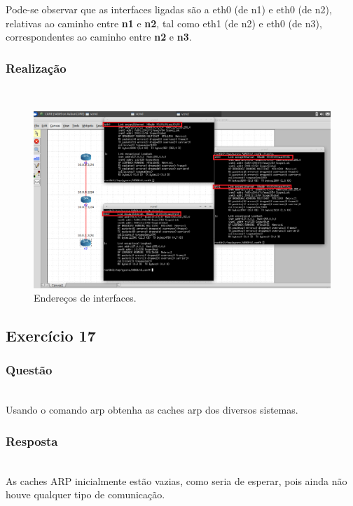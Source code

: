 \documentclass{llncs}
\begin{document}
Pode-se observar que as interfaces ligadas são a eth0 (de n1) e eth0 (de n2), relativas ao caminho entre \textbf{n1} e \textbf{n2}, tal como eth1 (de n2) e eth0 (de n3), correspondentes ao caminho entre \textbf{n2} e \textbf{n3}.

\subsubsection{Realização}\rule[-10pt]{0pt}{10pt}\\

\begin{figure}
  \begin{center}
    \includegraphics[scale=0.6]{./imagens/ifconfig.png} 
  \end{center}
  \caption{Endereços de interfaces.}
  \label{fig:ifconfig}
\end{figure} 

\clearpage
\subsection{Exercício 17}
\subsubsection{Questão}\rule[-10pt]{0pt}{10pt}\\

Usando o comando arp obtenha as caches arp dos diversos sistemas.

\subsubsection{Resposta}\rule[-10pt]{0pt}{10pt}\\

As caches ARP inicialmente estão vazias, como seria de esperar, pois ainda não houve qualquer tipo de comunicação.
\end{document}
